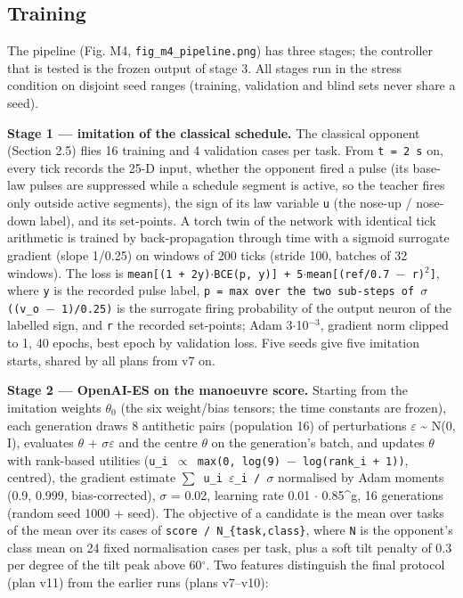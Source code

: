 \documentclass[10pt,a4paper]{article}
\begin{document}
\subsection{Training}

The pipeline (Fig. M4, \texttt{fig\_m4\_pipeline.png}) has three stages; the controller that is tested is the frozen output of stage 3. All stages run in the stress condition on disjoint seed ranges (training, validation and blind sets never share a seed).

\textbf{Stage 1 --- imitation of the classical schedule.} The classical opponent (Section 2.5) flies 16 training and 4 validation cases per task. From \texttt{t = 2 s} on, every tick records the 25-D input, whether the opponent fired a pulse (its base-law pulses are suppressed while a schedule segment is active, so the teacher fires only outside active segments), the sign of its law variable \texttt{u} (the nose-up / nose-down label), and its set-points. A torch twin of the network with identical tick arithmetic is trained by back-propagation through time with a sigmoid surrogate gradient (slope 1/0.25) on windows of 200 ticks (stride 100, batches of 32 windows). The loss is \texttt{mean[(1 + 2y)$\cdot$BCE(p, y)] + 5$\cdot$mean[(ref/0.7 $-$ r)$^{2}$]}, where \texttt{y} is the recorded pulse label, \texttt{p = max over the two sub-steps of $\sigma$((v\_o $-$ 1)/0.25)} is the surrogate firing probability of the output neuron of the labelled sign, and \texttt{r} the recorded set-points; Adam 3$\cdot$10$^{-3}$, gradient norm clipped to 1, 40 epochs, best epoch by validation loss. Five seeds give five imitation starts, shared by all plans from v7 on.

\textbf{Stage 2 --- OpenAI-ES on the manoeuvre score.} Starting from the imitation weights $\theta_{0}$ (the six weight/bias tensors; the time constants are frozen), each generation draws 8 antithetic pairs (population 16) of perturbations $\varepsilon$ \textasciitilde{} N(0, I), evaluates $\theta$ + $\sigma\varepsilon$ and the centre $\theta$ on the generation's batch, and updates $\theta$ with rank-based utilities (\texttt{u\_i $\propto$ max(0, log(9) $-$ log(rank\_i + 1))}, centred), the gradient estimate \texttt{$\sum$ u\_i $\varepsilon$\_i / $\sigma$} normalised by Adam moments (0.9, 0.999, bias-corrected), $\sigma$ = 0.02, learning rate 0.01 $\cdot$ 0.85\^{}g, 16 generations (random seed 1000 + seed). The objective of a candidate is the mean over tasks of the mean over its cases of \texttt{score / N\_\{task,class\}}, where \texttt{N} is the opponent's class mean on 24 fixed normalisation cases per task, plus a soft tilt penalty of 0.3 per degree of the tilt peak above 60$^\circ$. Two features distinguish the final protocol (plan v11) from the earlier runs (plans v7--v10):
\end{document}
